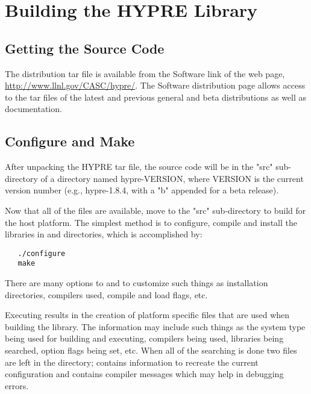 
\chapter{Building the HYPRE Library}


\section{Getting the Source Code}

The \hypre{} distribution tar file is available from the Software link of the
\hypre{} web page, \url{http://www.llnl.gov/CASC/hypre/}.  The \hypre{}
Software distribution page allows access to the tar files of the latest and
previous general and beta distributions as well as documentation.


\section{Configure and Make}

After unpacking the HYPRE tar file, the source code will be in the "src" 
sub-directory of a directory named hypre-VERSION, where VERSION is the current 
version number (e.g., hypre-1.8.4, with a "b" appended for a beta release).

Now that all of the files are available, move to the "src" sub-directory to build
\hypre{} for the host platform.  The simplest method is to configure, compile and
install the libraries in  and  directories,
which is accomplished by:
\begin{verbatim}
   ./configure
   make
\end{verbatim}

There are many options to  and  to customize such 
things as installation directories, compilers used, compile and load flags, etc.

Executing  results in the creation of platform specific files 
that are used when building the library. The information may include such things
as the system type being used for building and executing, compilers being used, 
libraries being searched, option flags being set, etc.  When all of the searching
is done two files are left in the  directory;  
contains information to recreate the current configuration and 
contains compiler messages which may help in debugging  errors. 

